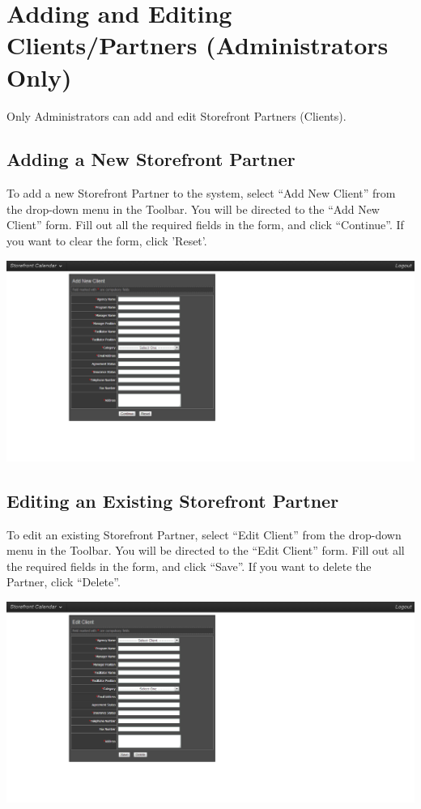 \section{Adding and Editing Clients/Partners (Administrators Only)}

Only Administrators can add and edit Storefront Partners (Clients).


\subsection{Adding a New Storefront Partner}

To add a new Storefront Partner to the system, select ``Add New Client'' from the drop-down menu in the Toolbar. You will be directed to the ``Add New Client'' form. Fill out all the required fields in the form, and click ``Continue''. If you want to clear the form, click 'Reset'.

\includegraphics[width=\linewidth]{screenshots/img_addclient}


\newpage


\subsection{Editing an Existing Storefront Partner}

To edit an existing Storefront Partner, select ``Edit Client'' from the drop-down menu in the Toolbar. You will be directed to the ``Edit Client'' form. Fill out all the required fields in the form, and click ``Save''. If you want to delete the Partner, click ``Delete''.

\includegraphics[width=\linewidth]{screenshots/img_editclient}




